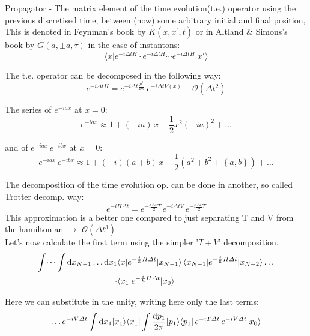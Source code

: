\documentclass[12pt,a4paper]{article}
\newcommand{\ket}[1]{{ |#1 \rangle}}
\newcommand{\bra}[1]{{\langle#1|}}
\numberwithin{equation}{section}
\begin{document}
Propagator - The matrix element of the time evolution(t.e.) operator using the previous discretised time, between (now) some arbitrary initial and final position, This is denoted in Feynman's book by $K(x,x^\prime,t)$  or in Altland \& Simons's book by $G(a,\pm a,\tau)$ in the case of instantons:
\begin{equation} \label{eq1:11}
\bra{x}e^{-i\Delta t H} \cdot e^{-i\Delta t H} \cdots e^{-i\Delta t H}\ket{x'} 
\end{equation}

The t.e. operator can be decomposed in the following way:
\begin{equation}
e^{-i\Delta t H} = e^{-i \Delta t \frac{p^2}{2m}}\, e^{-i \Delta t V(x)} + \mathcal{O} (\Delta t^2)
\end{equation}

The series of $e^{-iax}$ at $x = 0$:
\begin{equation}
e^{-i a x} \approx 1 + (-i a )\, x - \frac{1}{2}x^2 (-i a)^2 + \dots
\end{equation}

and of $e^{-i a x}\, e^{-i b x}$ at $x = 0$:
\begin{equation}
e^{-i a x}\, e^{-i b x} \approx 1 + (-i)(a+b)\, x - \frac{1}{2}(a^2 + b^2 + \left\lbrace a,b \right\rbrace) + \dots
\end{equation}

The decomposition of the time evolution op. can be done in another, so called Trotter decomp. way:
\begin{equation}
e^{-iH \Delta t} = e^{-i \frac{\Delta t}{2} T}\, e^{-i\Delta t V} \, e^{-i \frac{\Delta t}{2} T}
\end{equation}
This approximation is a better one compared to just separating T and V from the hamiltonian $\rightarrow$ $\mathcal{O}(\Delta t^3)$\\
Let's now calculate the first term using the simpler '$T + V$' decomposition. 
\begin{align}
\int \dots \int {\rm{d}}x_{N-1} \dots {\rm{d}} x_1 &\bra{x} e^{- \frac{i}{\hbar} H \Delta t} \ket{x_{N-1}}\, \bra{x_{N-1}} e^{- \frac{i}{\hbar} H \Delta t} \ket{x_{N-2}} \dots \\
\cdot &\bra{x_1} e^{- \frac{i}{\hbar} H \Delta t} \ket{x_{0}}  \nonumber
\end{align} 

Here we can substitute in the unity, writing here only the last terms:
\begin{equation}
\dots e^{-i V \Delta t}   \int {\rm{d}}x_1 \ket{x_1} {\bra{x_1}\int \frac{{\rm{d}}p_1}{2\pi} \ket{p_1}\bra{p_1}\,e^{-i T \Delta t}\, e^{-i V \Delta t} \ket{x_0}}
\end{equation}
\end{document}
